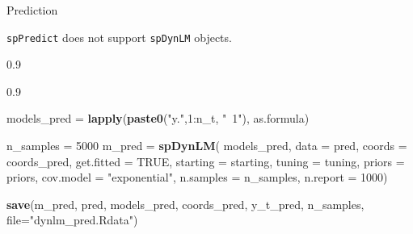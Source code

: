 \documentclass[11pt,ignorenonframetext,]{beamer}
\newenvironment{Shaded}{}{}
\newcommand{\KeywordTok}[1]{\textcolor[rgb]{0.00,0.44,0.13}{\textbf{#1}}}
\newcommand{\DataTypeTok}[1]{\textcolor[rgb]{0.56,0.13,0.00}{#1}}
\newcommand{\DecValTok}[1]{\textcolor[rgb]{0.25,0.63,0.44}{#1}}
\newcommand{\FloatTok}[1]{\textcolor[rgb]{0.25,0.63,0.44}{#1}}
\newcommand{\StringTok}[1]{\textcolor[rgb]{0.25,0.44,0.63}{#1}}
\newcommand{\OtherTok}[1]{\textcolor[rgb]{0.00,0.44,0.13}{#1}}
\newcommand{\OperatorTok}[1]{\textcolor[rgb]{0.40,0.40,0.40}{#1}}
\newcommand{\NormalTok}[1]{#1}
\let\oldShaded\Shaded
\let\endoldShaded\endShaded
\renewenvironment{Shaded}{\footnotesize\begin{spacing}{0.9}\oldShaded}{\endoldShaded\end{spacing}}
\begin{document}
\begin{frame}[fragile]{Prediction}

\texttt{spPredict} does not support \texttt{spDynLM} objects.

\begin{Shaded}
\end{Shaded}

\begin{Shaded}
\begin{Highlighting}[]
\NormalTok{models_pred =}\StringTok{ }\KeywordTok{lapply}\NormalTok{(}\KeywordTok{paste0}\NormalTok{(}\StringTok{"y."}\NormalTok{,}\DecValTok{1}\OperatorTok{:}\NormalTok{n_t, }\StringTok{"~1"}\NormalTok{), as.formula)}

\NormalTok{n_samples =}\StringTok{ }\DecValTok{5000}
\NormalTok{m_pred =}\StringTok{ }\KeywordTok{spDynLM}\NormalTok{(}
\NormalTok{  models_pred, }\DataTypeTok{data =}\NormalTok{ pred, }\DataTypeTok{coords =}\NormalTok{ coords_pred, }\DataTypeTok{get.fitted =} \OtherTok{TRUE}\NormalTok{,}
  \DataTypeTok{starting =}\NormalTok{ starting, }\DataTypeTok{tuning =}\NormalTok{ tuning, }\DataTypeTok{priors =}\NormalTok{ priors,}
  \DataTypeTok{cov.model =} \StringTok{"exponential"}\NormalTok{, }\DataTypeTok{n.samples =}\NormalTok{ n_samples, }\DataTypeTok{n.report =} \DecValTok{1000}\NormalTok{)}

\KeywordTok{save}\NormalTok{(m_pred, pred, models_pred, coords_pred, y_t_pred, n_samples, }
     \DataTypeTok{file=}\StringTok{"dynlm_pred.Rdata"}\NormalTok{)}
\end{Highlighting}
\end{Shaded}

\end{frame}
\end{document}

